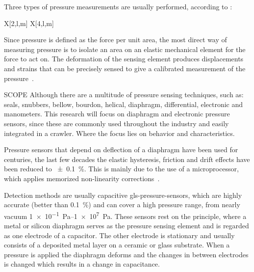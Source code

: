 \noindent Three types of pressure measurements are usually performed, according to \citet{webster_measurement_1999}:

\begin{RoyalTable}{X[2,l,m] X[4,l,m]}
\end{RoyalTable}

Since pressure is defined as the force per unit area, the most direct way of measuring pressure is to isolate an area on
an elastic mechanical element for the force to act on. The deformation of the sensing element produces displacements and
strains that can be precisely sensed to give a calibrated measurement of the pressure~\cite{webster_measurement_1999}.

\begin{RoyalNote}{SCOPE}
    Although there are a multitude of pressure sensing techniques, such as: seals, snubbers, bellow, bourdon, helical,
    diaphragm, differential, electronic and manometers. This research will focus on diaphragm and electronic pressure
    sensors, since these are commonly used throughout the industry and easily integrated in a crawler. Where the focus
    lies on behavior and characteristics.
\end{RoyalNote}

Pressure sensors that depend on deflection of a diaphragm have been used for centuries, the last few decades the elastic
hysteresis, friction and drift effects have been reduced to \SI{\pm 0.1}{\percent}. This is mainly due to the use of a
microprocessor, which applies memorized non-linearity corrections~\cite{liptak_instrument_2003}.

Detection methods are usually capacitive \gls{gls-pressure-sensor}s, which are highly accurate (better than
\SI{0.1}{\percent}) and can cover a high pressure range, from nearly vacuum \SIrange{1e-1}{1e7}{\pascal}. These sensors
rest on the principle, where a metal or silicon diaphragm serves as the pressure sensing element and is regarded as one
electrode of a capacitor. The other electrode is stationary and usually consists of a deposited metal layer on a ceramic
or glass substrate. When a pressure is applied the diaphragm deforms and the changes in between electrodes is changed
which results in a change in capacitance.

